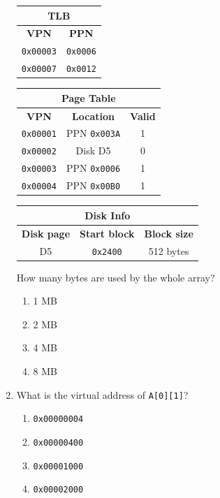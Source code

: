 \documentclass[a4paper,12pt]{article}
\begin{document}
\begin{enumerate}[label=\textbf{\arabic*.}]
    \begin{center}
    \scriptsize
    \begin{tabular}{|c|c|}
    \hline
    \multicolumn{2}{|c|}{\textbf{TLB}} \\ \hline
    \textbf{VPN} & \textbf{PPN} \\ \hline
    \texttt{0x00003} & \texttt{0x0006} \\ \hline
    \texttt{0x00007} & \texttt{0x0012} \\ \hline
    \end{tabular}
    \hspace{0.5cm}
    \begin{tabular}{|c|c|c|}
    \hline
    \multicolumn{3}{|c|}{\textbf{Page Table}} \\ \hline
    \textbf{VPN} & \textbf{Location} & \textbf{Valid} \\ \hline
    \texttt{0x00001} & PPN \texttt{0x003A} & 1 \\ \hline
    \texttt{0x00002} & Disk D5 & 0 \\ \hline
    \texttt{0x00003} & PPN \texttt{0x0006} & 1 \\ \hline
    \texttt{0x00004} & PPN \texttt{0x00B0} & 1 \\ \hline
    \end{tabular}
    \hspace{0.5cm}
    \begin{tabular}{|c|c|c|}
    \hline
    \multicolumn{3}{|c|}{\textbf{Disk Info}} \\ \hline
    \textbf{Disk page} & \textbf{Start block} & \textbf{Block size} \\ \hline
    D5 & \texttt{0x2400} & 512 bytes \\ \hline
    \end{tabular}
    \end{center}

    How many bytes are used by the whole array?
    \begin{enumerate}[label=\alph*)]
        \item 1 MB
        \item 2 MB
        \item 4 MB
        \item 8 MB
    \end{enumerate}

    \item What is the virtual address of \texttt{A[0][1]}?
    \begin{enumerate}[label=\alph*)]
        \item \texttt{0x00000004}
        \item \texttt{0x00000400}
        \item \texttt{0x00001000}
        \item \texttt{0x00002000}
    \end{enumerate}


\end{enumerate}
\end{document}
